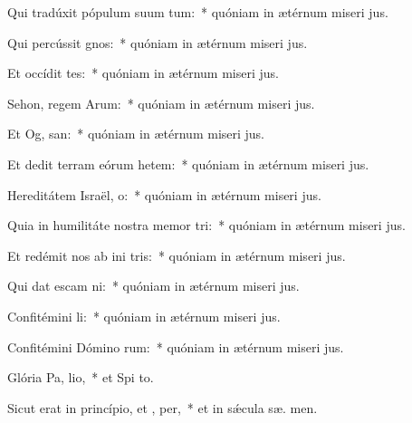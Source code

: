 \item Qui tradúxit pópulum suum  tum:~* quóniam in ætérnum miseri jus.
\item Qui percússit  gnos:~* quóniam in ætérnum miseri jus.
\item Et occídit  tes:~* quóniam in ætérnum miseri jus.
\item Sehon, regem Arum:~* quóniam in ætérnum miseri jus.
\item Et Og,  san:~* quóniam in ætérnum miseri jus.
\item Et dedit terram eórum hetem:~* quóniam in ætérnum miseri jus.
\item Hereditátem Israël,  o:~* quóniam in ætérnum miseri jus.
\item Quia in humilitáte nostra memor  tri:~* quóniam in ætérnum miseri jus.
\item Et redémit nos ab ini tris:~* quóniam in ætérnum miseri jus.
\item Qui dat escam  ni:~* quóniam in ætérnum miseri jus.
\item Confitémini  li:~* quóniam in ætérnum miseri jus.
\item Confitémini Dómino rum:~* quóniam in ætérnum miseri jus.
\item Glória Pa,  lio,~* et Spi to.
\item Sicut erat in princípio, et ,  per,~* et in sǽcula sæ. men.
